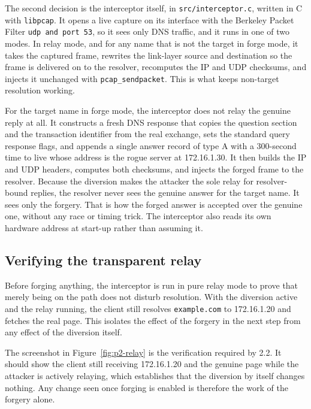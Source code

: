 \documentclass[11pt]{article}
\begin{document}
The second decision is the interceptor itself, in \texttt{src/interceptor.c},
written in C with \texttt{libpcap}. It opens a live capture on its interface with
the Berkeley Packet Filter \texttt{udp and port 53}, so it sees only DNS traffic,
and it runs in one of two modes. In relay mode, and for any name that is not the
target in forge mode, it takes the captured frame, rewrites the link-layer source
and destination so the frame is delivered on to the resolver, recomputes the IP
and UDP checksums, and injects it unchanged with \texttt{pcap\_sendpacket}. This
is what keeps non-target resolution working.

For the target name in forge mode, the interceptor does not relay the genuine
reply at all. It constructs a fresh DNS response that copies the question section
and the transaction identifier from the real exchange, sets the standard query
response flags, and appends a single answer record of type A with a 300-second
time to live whose address is the rogue server at 172.16.1.30. It then builds the
IP and UDP headers, computes both checksums, and injects the forged frame to the
resolver. Because the diversion makes the attacker the sole relay for
resolver-bound replies, the resolver never sees the genuine answer for the target
name. It sees only the forgery. That is how the forged answer is accepted over the
genuine one, without any race or timing trick. The interceptor also reads its own
hardware address at start-up rather than assuming it.

\subsection{Verifying the transparent relay}

Before forging anything, the interceptor is run in pure relay mode to prove that
merely being on the path does not disturb resolution. With the diversion active
and the relay running, the client still resolves \texttt{example.com} to
172.16.1.20 and fetches the real page. This isolates the effect of the forgery in
the next step from any effect of the diversion itself.


The screenshot in Figure~\ref{fig:p2-relay} is the verification required by 2.2.
It should show the client still receiving 172.16.1.20 and the genuine page while
the attacker is actively relaying, which establishes that the diversion by itself
changes nothing. Any change seen once forging is enabled is therefore the work of
the forgery alone.
\end{document}
